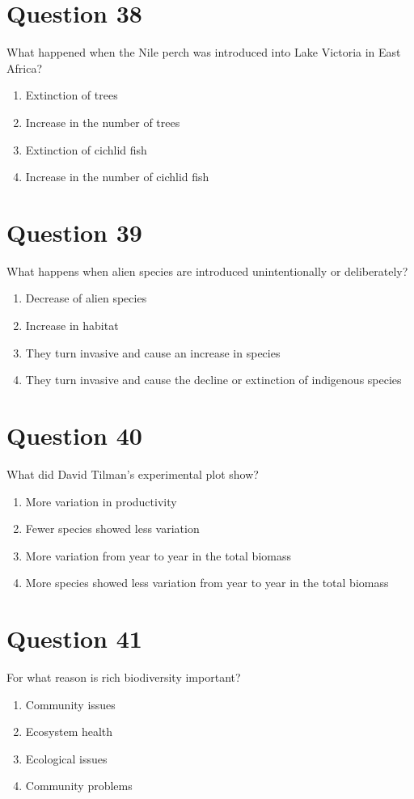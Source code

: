 \documentclass{article}
\begin{document}
\section*{Question 38}
What happened when the Nile perch was introduced into Lake Victoria in East Africa?\newline
\begin{enumerate}[label=(\alph*)]
\item Extinction of trees
\item Increase in the number of trees
\item Extinction of cichlid fish
\item Increase in the number of cichlid fish
\end{enumerate}
\newpage
\section*{Question 39}
What happens when alien species are introduced unintentionally or deliberately?\newline
\begin{enumerate}[label=(\alph*)]
\item Decrease of alien species
\item Increase in habitat
\item They turn invasive and cause an increase in species
\item They turn invasive and cause the decline or extinction of indigenous species
\end{enumerate}
\newpage
\section*{Question 40}
What did David Tilman’s experimental plot show?\newline
\begin{enumerate}[label=(\alph*)]
\item More variation in productivity
\item Fewer species showed less variation
\item More variation from year to year in the total biomass
\item More species showed less variation from year to year in the total biomass
\end{enumerate}
\newpage
\section*{Question 41}
For what reason is rich biodiversity important?\newline
\begin{enumerate}[label=(\alph*)]
\item Community issues
\item Ecosystem health
\item Ecological issues
\item Community problems
\end{enumerate}
\newpage
\end{document}
